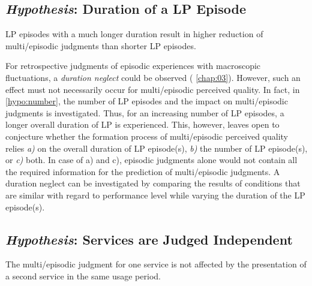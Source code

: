 \subsection[H6: Duration of a \acs{LP} Episode]{\emph{Hypothesis}: Duration of a \acs{LP} Episode}
\begin{hypothesis}\label{hypo:duration}
\ac{LP} episodes with a much longer duration result in higher reduction of multi\-/episodic judgments than shorter \ac{LP} episodes.
\end{hypothesis}

For retrospective judgments of episodic experiences with macroscopic fluctuations, a \emph{duration neglect} could be observed (\cf{} \autoref{chap:03}).
However, such an effect must not necessarily occur for multi\-/episodic perceived quality.
In fact, in \autoref{hypo:number}, the number of \ac{LP} episodes and the impact on multi\-/episodic judgments is investigated.
Thus, for an increasing number of \ac{LP} episodes, a longer overall duration of \ac{LP} is experienced.
This, however, leaves open to conjecture whether the formation process of multi\-/episodic perceived quality relies \emph{a)} on the overall duration of \ac{LP} episode(s), \emph{b)} the number of \ac{LP} episode(s), or \emph{c)} both.
In case of a) and c), episodic judgments alone would not contain all the required information for the prediction of multi\-/episodic judgments.
A duration neglect can be investigated by comparing the results of conditions that are similar with regard to performance level while varying the duration of the \ac{LP} episode(s).

\subsection[H7: Services are Judged Independent]{\emph{Hypothesis}: Services are Judged Independent}
\begin{hypothesis}\label{hypo:independent}
The multi\-/episodic judgment for one service is not affected by the presentation of a second service in the same usage period.
\end{hypothesis}

